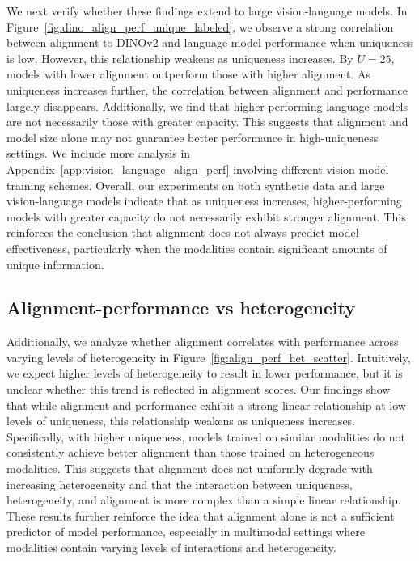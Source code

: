 We next verify whether these findings extend to large vision-language models. In Figure~\ref{fig:dino_align_perf_unique_labeled}, we observe a strong correlation between alignment to DINOv2 and language model performance when uniqueness is low. However, this relationship weakens as uniqueness increases. By \(U=25\), models with lower alignment outperform those with higher alignment. As uniqueness increases further, the correlation between alignment and performance largely disappears. Additionally, we find that higher-performing language models are not necessarily those with greater capacity. This suggests that alignment and model size alone may not guarantee better performance in high-uniqueness settings. We include more analysis in Appendix~\ref{app:vision_language_align_perf} involving different vision model training schemes. Overall, our experiments on both synthetic data and large vision-language models indicate that as uniqueness increases, higher-performing models with greater capacity do not necessarily exhibit stronger alignment. This reinforces the conclusion that alignment does not always predict model effectiveness, particularly when the modalities contain significant amounts of unique information. 

\subsection{Alignment-performance vs heterogeneity}

Additionally, we analyze whether alignment correlates with performance across varying levels of heterogeneity in Figure~\ref{fig:align_perf_het_scatter}. Intuitively, we expect higher levels of heterogeneity to result in lower performance, but it is unclear whether this trend is reflected in alignment scores. Our findings show that while alignment and performance exhibit a strong linear relationship at low levels of uniqueness, this relationship weakens as uniqueness increases. Specifically, with higher uniqueness, models trained on similar modalities do not consistently achieve better alignment than those trained on heterogeneous modalities. This suggests that alignment does not uniformly degrade with increasing heterogeneity and that the interaction between uniqueness, heterogeneity, and alignment is more complex than a simple linear relationship. 
These results further reinforce the idea that alignment alone is not a sufficient predictor of model performance, especially in multimodal settings where modalities contain varying levels of interactions and heterogeneity.

